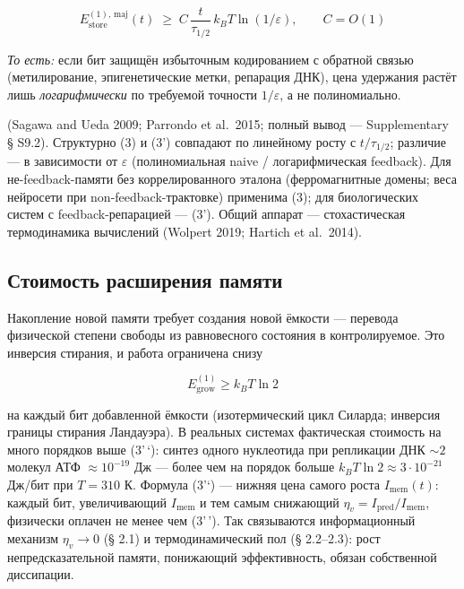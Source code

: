 \documentclass[pdflatex,sn-mathphys-ay]{sn-jnl}
\begin{document}
\begin{equation}E_{\text{store}}^{(1),\,\text{maj}}(t) \;\ge\; C\,\frac{t}{\tau_{1/2}}\, k_B T \ln(1/\varepsilon), \qquad C = O(1) \tag{3'}\end{equation}



\emph{То есть:} если бит защищён избыточным кодированием с обратной связью (метилирование, эпигенетические метки, репарация ДНК), цена удержания растёт лишь \emph{логарифмически} по требуемой точности \(1/\varepsilon\), а не полиномиально.



(Sagawa and Ueda 2009; Parrondo et al.~2015; полный вывод --- Supplementary § S9.2). Структурно (3) и (3') совпадают по линейному росту с \(t/\tau_{1/2}\); различие --- в зависимости от \(\varepsilon\) (полиномиальная naive / логарифмическая feedback). Для не-feedback-памяти без коррелированного эталона (ферромагнитные домены; веса нейросети при non-feedback-трактовке) применима (3); для биологических систем с feedback-репарацией --- (3'). Общий аппарат --- стохастическая термодинамика вычислений (Wolpert 2019; Hartich et al.~2014).



\subsection{Стоимость расширения памяти}\label{ux441ux442ux43eux438ux43cux43eux441ux442ux44c-ux440ux430ux441ux448ux438ux440ux435ux43dux438ux44f-ux43fux430ux43cux44fux442ux438}



Накопление новой памяти требует создания новой ёмкости --- перевода физической степени свободы из равновесного состояния в контролируемое. Это инверсия стирания, и работа ограничена снизу



\begin{equation}E_{\text{grow}}^{(1)} \ge k_B T \ln 2 \tag{3''}\end{equation}



на каждый бит добавленной ёмкости (изотермический цикл Силарда; инверсия границы стирания Ландауэра). В реальных системах фактическая стоимость на много порядков выше (3'\,`): синтез одного нуклеотида при репликации ДНК \(\sim 2\) молекул АТФ \(\approx 10^{-19}\) Дж --- более чем на порядок больше \(k_B T \ln 2 \approx 3\cdot10^{-21}\) Дж/бит при \(T = 310\) К. Формула (3'`) --- нижняя цена самого роста \(I_{\text{mem}}(t)\): каждый бит, увеличивающий \(I_{\text{mem}}\) и тем самым снижающий \(\eta_v = I_{\text{pred}}/I_{\text{mem}}\), физически оплачен не менее чем (3'\,'). Так связываются информационный механизм \(\eta_v \to 0\) (§ 2.1) и термодинамический пол (§ 2.2--2.3): рост непредсказательной памяти, понижающий эффективность, обязан собственной диссипации.
\end{document}
